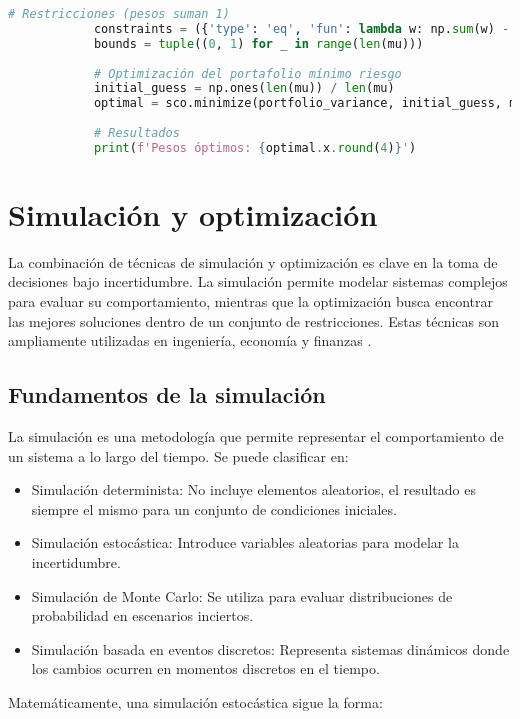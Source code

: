 \begin{itemize}
\begin{lstlisting}[language=Python, caption={Optimización de portafolios con SciPy}]
			# Restricciones (pesos suman 1)
			constraints = ({'type': 'eq', 'fun': lambda w: np.sum(w) - 1})
			bounds = tuple((0, 1) for _ in range(len(mu)))
			
			# Optimización del portafolio mínimo riesgo
			initial_guess = np.ones(len(mu)) / len(mu)
			optimal = sco.minimize(portfolio_variance, initial_guess, method='SLSQP', bounds=bounds, constraints=constraints)
			
			# Resultados
			print(f'Pesos óptimos: {optimal.x.round(4)}')
		\end{lstlisting}
		\section{Simulación y optimización}
		
		La combinación de técnicas de simulación y optimización es clave en la toma de decisiones bajo incertidumbre. La simulación permite modelar sistemas complejos para evaluar su comportamiento, mientras que la optimización busca encontrar las mejores soluciones dentro de un conjunto de restricciones. Estas técnicas son ampliamente utilizadas en ingeniería, economía y finanzas \cite{law2007simulation}.
		
		\subsection{Fundamentos de la simulación}
		
		La simulación es una metodología que permite representar el comportamiento de un sistema a lo largo del tiempo. Se puede clasificar en:
		
		\begin{itemize}
			\item Simulación determinista: No incluye elementos aleatorios, el resultado es siempre el mismo para un conjunto de condiciones iniciales.
			\item Simulación estocástica: Introduce variables aleatorias para modelar la incertidumbre.
			\item Simulación de Monte Carlo: Se utiliza para evaluar distribuciones de probabilidad en escenarios inciertos.
			\item Simulación basada en eventos discretos: Representa sistemas dinámicos donde los cambios ocurren en momentos discretos en el tiempo.
		\end{itemize}
		
		Matemáticamente, una simulación estocástica sigue la forma:
		

\end{itemize}
